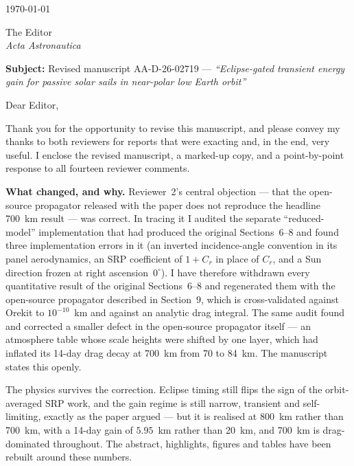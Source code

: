 \documentclass[11pt,a4paper]{article}
\begin{document}
\pagestyle{empty}

\begin{flushright}\today\end{flushright}

\noindent
The Editor\\
\textit{Acta Astronautica}

\vspace{0.3em}

\noindent\textbf{Subject:} Revised manuscript AA-D-26-02719 ---
\textit{``Eclipse-gated transient energy gain for passive solar sails in near-polar low Earth orbit''}

Dear Editor,

Thank you for the opportunity to revise this manuscript, and please convey my thanks to both reviewers for reports that were exacting and, in the end, very useful. I enclose the revised manuscript, a marked-up copy, and a point-by-point response to all fourteen reviewer comments.

\textbf{What changed, and why.} Reviewer~2's central objection --- that the open-source propagator released with the paper does not reproduce the headline 700~km result --- was correct. In tracing it I audited the separate ``reduced-model'' implementation that had produced the original Sections~6--8 and found three implementation errors in it (an inverted incidence-angle convention in its panel aerodynamics, an SRP coefficient of \(1+C_r\) in place of \(C_r\), and a Sun direction frozen at right ascension~\(0^\circ\)). I have therefore withdrawn every quantitative result of the original Sections~6--8 and regenerated them with the open-source propagator described in Section~9, which is cross-validated against Orekit to \(10^{-10}\)~km and against an analytic drag integral. The same audit found and corrected a smaller defect in the open-source propagator itself --- an atmosphere table whose scale heights were shifted by one layer, which had inflated its 14-day drag decay at 700~km from 70 to 84~km. The manuscript states this openly.

The physics survives the correction. Eclipse timing still flips the sign of the orbit-averaged SRP work, and the gain regime is still narrow, transient and self-limiting, exactly as the paper argued --- but it is realised at 800~km rather than 700~km, with a 14-day gain of \(5.95\)~km rather than 20~km, and 700~km is drag-dominated throughout. The abstract, highlights, figures and tables have been rebuilt around these numbers.
\end{document}
